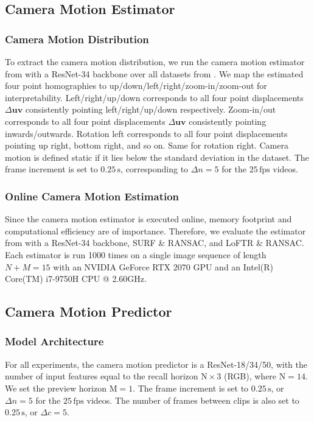 \subsection{Camera Motion Estimator}
\label{c4:sec:camera_motion_estimator}
\subsubsection{Camera Motion Distribution} 
To extract the camera motion distribution, we run the camera motion estimator from \cite{huber2022deep} with a ResNet-34 backbone over all datasets from . We map the estimated four point homographies to up/down/left/right/zoom-in/zoom-out for interpretability. Left/right/up/down corresponds to all four point displacements $\Delta\mathbf{uv}$ consistently pointing left/right/{\allowbreak}up/down respectively.
Zoom-in/out corresponds to all four point displacements $\Delta\mathbf{uv}$ consistently pointing inwards/outwards. Rotation left corresponds to all four point displacements pointing up right, bottom right, and so on. Same for rotation right. Camera motion is defined static if it lies below the standard deviation in the dataset. The frame increment is set to $0.25\,\text{s}$, corresponding to $\Delta n = 5$ for the $25\,\text{fps}$ videos.

\subsubsection{Online Camera Motion Estimation}
\label{c4:sec:online_camera_motion_estimation}
Since the camera motion estimator is executed online, memory footprint and computational efficiency are of importance. Therefore, we evaluate the estimator from \cite{huber2022deep} with a ResNet-34 backbone, SURF \& RANSAC, and LoFTR \cite{sun2021loftr} \& RANSAC. Each estimator is run 1000 times on a single image sequence of length $N+M=15$ with an NVIDIA GeForce RTX 2070 GPU and an Intel(R) Core(TM) i7-9750H CPU @ 2.60GHz.

\subsection{Camera Motion Predictor}
\label{c4:sec:camera_motion_predictor_experiments}
\subsubsection{Model Architecture}
For all experiments, the camera motion predictor is a ResNet-18/34/50, with the number of input features equal to the recall horizon $\text{N}\times3$ (RGB), where $\text{N}=14$. We set the preview horizon $\text{M}=1$. The frame increment is set to $0.25\,\text{s}$, or $\Delta n = 5$ for the $25\,\text{fps}$ videos. The number of frames between clips is also set to $0.25\,\text{s}$, or $\Delta c = 5$.

